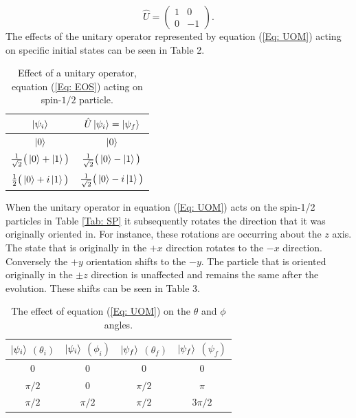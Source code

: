 \documentclass[twocolumn]{article}
\begin{document}
\begin{equation}\label{Eq: UOM}
\hat{U}=
\begin{pmatrix}
1 & 0 \\
0 & -1
\end{pmatrix}.
\end{equation}
The effects of the unitary operator represented by equation (\ref{Eq: UOM}) acting on specific initial states can be seen in Table 2.
\begin{table}[ht]
    \centering
    \begin{tabular}{|c|c|}
        \hline $\ket{\psi_i}$& $\hat{U}\ket{\psi_i}=\ket{\psi_f}$ \\
        \hline $\ket{0}$& $\ket{0}$\\
        \hline $\frac{1}{\sqrt{2}}\big(\ket{0}+\ket{1}\big)$& $\frac{1}{\sqrt{2}}\big(\ket{0}-\ket{1}\big)$\\
        \hline $\frac{1}{2}\big(\ket{0}+i\ket{1}\big)$& $\frac{1}{\sqrt{2}}\big(\ket{0}-i\ket{1}\big)$\\
        \hline
    \end{tabular}
    \caption{\footnotesize{Effect of a unitary operator, equation (\ref{Eq: EOS}) acting on spin-$1/2$ particle.}}
    \label{Tab: UOE}
\end{table}
\par \noindent
When the unitary operator in equation (\ref{Eq: UOM}) acts on the spin-1/2 particles in Table \ref{Tab: SP} it subsequently rotates the direction that it was originally oriented in. For instance, these rotations are occurring about the $z$ axis. The state that is originally in the $+x$ direction rotates to the $-x$ direction. Conversely the $+y$ orientation shifts to the $-y$. The particle that is oriented originally in the $\pm z$ direction is unaffected and remains the same after the evolution. These shifts can be seen in Table 3.
\newpage
\begin{table}[ht]
    \centering
    \begin{tabular}{|c|c|c|c|}
         \hline $\ket{\psi_i}$ $(\theta_i)$& $\ket{\psi_i}$ $(\phi_i)$& $\ket{\psi_f}$ $(\theta_f)$& $\ket{\psi_f}$ $(\psi_f)$ \\
         \hline 0 & 0 & 0 & 0 \\
         \hline $\pi/2$ & 0 & $\pi/2$ & $\pi$ \\
         \hline $\pi/2$ & $\pi/2$ & $\pi/2$ & $3\pi/2$ \\
         \hline
    \end{tabular}
    \caption{\footnotesize{The effect of equation (\ref{Eq: UOM}) on the $\theta$ and $\phi$ angles.}}
    \label{Tab: SFUO}
\end{table}
\end{document}
